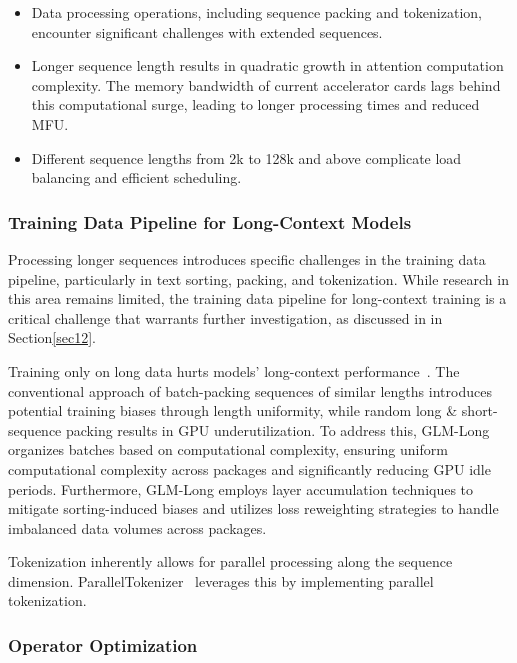 \begin{itemize}[leftmargin=2em]
\item Data processing operations, including sequence packing and tokenization, encounter significant challenges with extended sequences.
\item Longer sequence length results in quadratic growth in attention computation complexity. The memory bandwidth of current accelerator cards lags behind this computational surge, leading to longer processing times and reduced MFU.
\item Different sequence lengths from 2k to 128k and above complicate load balancing and efficient scheduling.
\end{itemize}

\subsubsection{Training Data Pipeline for Long-Context Models}

Processing longer sequences introduces specific challenges in the training data pipeline, particularly in text sorting, packing, and tokenization. While research in this area remains limited, the training data pipeline for long-context training is a critical challenge that warrants further investigation, as discussed in  \textbf{} in Section\ref{sec12}.

Training only on long data hurts models' long-context performance~\citep{gao2024train}. The conventional approach of batch-packing sequences of similar lengths introduces potential training biases through length uniformity, while random long \& short-sequence packing results in GPU underutilization. To address this, GLM-Long~\citep{chatglm2024glmlong} organizes batches based on computational complexity, ensuring uniform computational complexity across packages and significantly reducing GPU idle periods. Furthermore, GLM-Long employs layer accumulation techniques to mitigate sorting-induced biases and utilizes loss reweighting strategies to handle imbalanced data volumes across packages. 

Tokenization inherently allows for parallel processing along the sequence dimension. ParallelTokenizer~\citep{cai2024internlm2, ParallelTokenizer} leverages this by implementing parallel tokenization.

\subsubsection{Operator Optimization}

